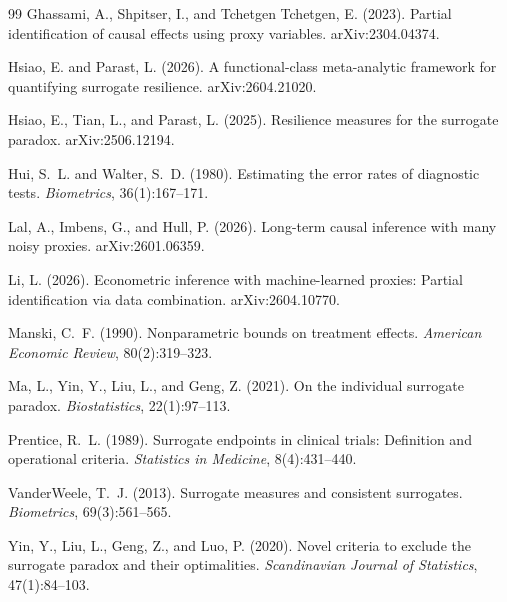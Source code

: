 \documentclass[11pt]{article}
\theoremstyle{definition}
\theoremstyle{plain}
\theoremstyle{remark}
\begin{document}
\begin{thebibliography}{99}
Ghassami, A., Shpitser, I., and Tchetgen Tchetgen, E. (2023).
\newblock Partial identification of causal effects using proxy variables.
\newblock arXiv:2304.04374.

Hsiao, E. and Parast, L. (2026).
\newblock A functional-class meta-analytic framework for quantifying surrogate resilience.
\newblock arXiv:2604.21020.

Hsiao, E., Tian, L., and Parast, L. (2025).
\newblock Resilience measures for the surrogate paradox.
\newblock arXiv:2506.12194.

Hui, S.~L. and Walter, S.~D. (1980).
\newblock Estimating the error rates of diagnostic tests.
\newblock \emph{Biometrics}, 36(1):167--171.

Lal, A., Imbens, G., and Hull, P. (2026).
\newblock Long-term causal inference with many noisy proxies.
\newblock arXiv:2601.06359.

Li, L. (2026).
\newblock Econometric inference with machine-learned proxies: Partial identification via data combination.
\newblock arXiv:2604.10770.

Manski, C.~F. (1990).
\newblock Nonparametric bounds on treatment effects.
\newblock \emph{American Economic Review}, 80(2):319--323.

Ma, L., Yin, Y., Liu, L., and Geng, Z. (2021).
\newblock On the individual surrogate paradox.
\newblock \emph{Biostatistics}, 22(1):97--113.

Prentice, R.~L. (1989).
\newblock Surrogate endpoints in clinical trials: Definition and operational criteria.
\newblock \emph{Statistics in Medicine}, 8(4):431--440.

VanderWeele, T.~J. (2013).
\newblock Surrogate measures and consistent surrogates.
\newblock \emph{Biometrics}, 69(3):561--565.

Yin, Y., Liu, L., Geng, Z., and Luo, P. (2020).
\newblock Novel criteria to exclude the surrogate paradox and their optimalities.
\newblock \emph{Scandinavian Journal of Statistics}, 47(1):84--103.
\end{thebibliography}
\end{document}
